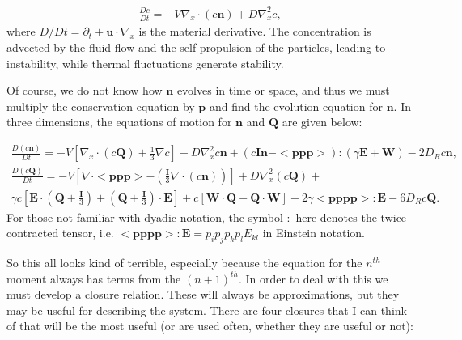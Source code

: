 \documentclass[onecolumn,showpacs,preprintnumbers,prl,amsmath,amssymb]{revtex4-1}
\def\b{\mathbf}
\begin{document}
\begin{gather}
\label{concen}
\frac{D c}{Dt}=-V\nabla_x\cdot(c \b{n})+D\nabla_x^2c,
\end{gather}
where $D/Dt=\partial_t+\b{u}\cdot\nabla_x$ is the material derivative. The concentration is advected by the fluid flow and the self-propulsion of the particles, leading to instability, while thermal fluctuations generate stability.

Of course, we do not know how $\b{n}$ evolves in time or space, and thus we must multiply the conservation equation by $\b{p}$ and find the evolution equation for $\b{n}$. In three dimensions, the equations of motion for $\b{n}$ and $\b{Q}$ are given below:

\begin{gather}
\label{polar}
\frac{D(c\b{n})}{Dt}=-V\left[\nabla_x\cdot(c\b{Q})+\frac{1}{3}\nabla c\right]+D\nabla_x^2c\b{n}+(c\b{In}-<\b{ppp}>):(\gamma\b{E}+\b{W})-2D_Rc\b{n},\\
\label{nem}
\frac{D(c\b{Q})}{Dt}=-V\left[\nabla\cdot<\b{ppp}>-(\frac{\b{I}}{3}\nabla\cdot(c\b{n}))\right]+D\nabla_x^2(c\b{Q})+\\
\nonumber\gamma c\left[\b{E}\cdot(\b{Q}+\frac{\b{I}}{3})+(\b{Q}+\frac{\b{I}}{3})\cdot\b{E}\right]+c\left[\b{W}\cdot\b{Q}-\b{Q}\cdot\b{W}\right]-2\gamma<\b{pppp}>:\b{E}-6D_Rc\b{Q}.
\end{gather}
For those not familiar with dyadic notation, the symbol $:$ here denotes the twice contracted tensor, i.e. $<\b{pppp}>:\b{E}=p_ip_jp_kp_lE_{kl}$ in Einstein notation. 

So this all looks kind of terrible, especially because the equation for the $n^{th}$ moment always has terms from the $(n+1)^{th}$. In order to deal with this we must develop a closure relation. These will always be approximations, but they may be useful for describing the system. There are four closures that I can think of that will be the most useful (or are used often, whether they are useful or not):
\end{document}
